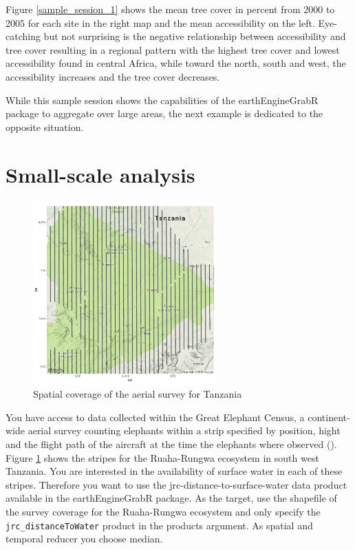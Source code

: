 Figure \ref{sample_session_1} shows the mean tree cover in percent from 2000 to 2005 for each site in the right map and the mean accessibility on the left. Eye-catching but not surprising is the negative relationship between accessibility and tree cover resulting in a regional pattern with the highest tree cover and lowest accessibility found in central Africa, while toward the north, south and west, the accessibility increases and the tree cover decreases.

While this sample session shows the capabilities of the earthEngineGrabR package to aggregate over large areas, the next example is dedicated to the opposite situation. 

\newpage

\section{Small-scale analysis}



\begin{figure}
	\begin{center}
		\vspace{-10mm}
		\includegraphics[width=7cm]{images/stripes-cropped.pdf}
		\caption{Spatial coverage of the aerial survey for Tanzania}
		\label{stripes}
	\end{center}
\end{figure}

You have access to data collected within the Great Elephant Census, a continent-wide aerial survey counting  elephants within a strip specified by position, hight and the flight path of the aircraft at the time the elephants where observed (\cite{beale2017spatial}). 
Figure \ref{stripes} shows the stripes for the Ruaha-Rungwa ecosystem in south west Tanzania.
You are interested in the availability of surface water in each of these stripes. Therefore you want to use the jrc-distance-to-surface-water data product available in the earthEngineGrabR package. 
As the target, use the shapefile of the survey coverage for the Ruaha-Rungwa ecosystem and only specify the \texttt{jrc\_distanceToWater} product in the products argument. As spatial and temporal reducer you choose median. 

